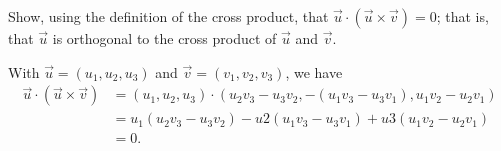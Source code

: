 
\begin{Exercise}[
name={},
title={}, 
difficulty=0,
origin={\cite{GHC}}]
Show, using the definition of the cross product, that $\vec u\cdot(\vec u\times\vec v)=0$; that is, that $\vec u$ is orthogonal to the cross product of $\vec u$ and $\vec v$.
\end{Exercise}

\begin{Answer}
With $\vec u = (u_1,u_2,u_3)$ and $\vec v = (v_1,v_2,v_3)$, we have
\begin{align*}
\vec u\cdot(\vec u\times\vec v) &= (u_1,u_2,u_3)\cdot (u_2v_3-u_3v_2,-(u_1v_3-u_3v_1),u_1v_2-u_2v_1) \\
		&= u_1(u_2v_3-u_3v_2) - u2(u_1v_3-u_3v_1)+u3(u_1v_2-u_2v_1)\\
		&=0.
\end{align*}

\end{Answer}
